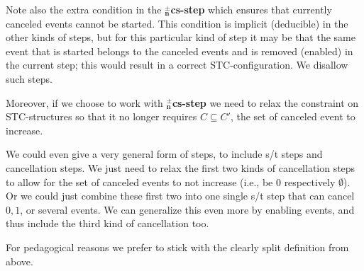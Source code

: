 \documentclass[submission,copyright,creativecommons]{eptcs}
\begin{document}
Note also the extra condition in the \textbf{$^{\pm}_{\mathbf{n}}$cs-step} which ensures that currently canceled events cannot be started. This condition is implicit (deducible) in the other kinds of steps, but for this particular kind of step it may be that the same event that is started belongs to the canceled events and is removed (enabled) in the current step; this would result in a correct STC-configuration. We disallow such steps.

Moreover, if we choose to work with \textbf{$^{\pm}_{\mathbf{n}}$cs-step} we need to relax the constraint on STC-structures so that it no longer requires $C\subseteq C'$, the set of canceled event to increase.

We could even give a very general form of steps, to include s/t steps and cancellation steps. We just need to relax the first two kinds of cancellation steps to allow for the set of canceled events to not increase (i.e., be $0$ respectively $\emptyset$). Or we could just combine these first two into one single s/t step that can cancel $0,1$, or several events. We can generalize this even more by enabling events, and thus include the third kind of cancellation too.

For pedagogical reasons we prefer to stick with the clearly split definition from above.
\end{document}
